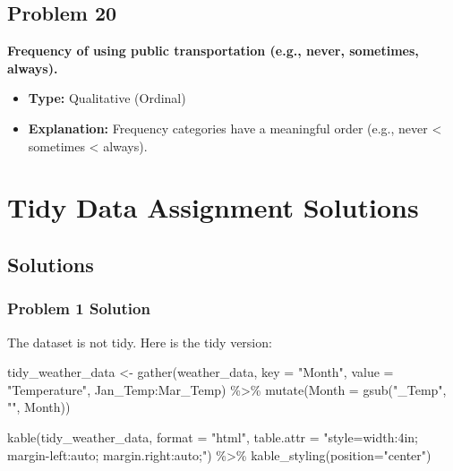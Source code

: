 \documentclass[
  letterpaper,
  DIV=11,
  numbers=noendperiod]{scrreprt}
\newenvironment{Shaded}{\begin{snugshade}}{\end{snugshade}}
\newcommand{\AttributeTok}[1]{\textcolor[rgb]{0.40,0.45,0.13}{#1}}
\newcommand{\FunctionTok}[1]{\textcolor[rgb]{0.28,0.35,0.67}{#1}}
\newcommand{\NormalTok}[1]{\textcolor[rgb]{0.00,0.23,0.31}{#1}}
\newcommand{\OtherTok}[1]{\textcolor[rgb]{0.00,0.23,0.31}{#1}}
\newcommand{\SpecialCharTok}[1]{\textcolor[rgb]{0.37,0.37,0.37}{#1}}
\newcommand{\StringTok}[1]{\textcolor[rgb]{0.13,0.47,0.30}{#1}}
\begin{document}
\section*{Problem 20}\label{problem-20-1}


\textbf{Frequency of using public transportation (e.g., never,
sometimes, always).}

\begin{itemize}
\item
  \textbf{Type:} Qualitative (Ordinal)
\item
  \textbf{Explanation:} Frequency categories have a meaningful order
  (e.g., never \textless{} sometimes \textless{} always).
\end{itemize}

\chapter*{Tidy Data Assignment
Solutions}\label{tidy-data-assignment-solutions}


\section*{Solutions}\label{solutions}


\subsection*{Problem 1 Solution}\label{problem-1-solution}

The dataset is not tidy. Here is the tidy version:

\begin{Shaded}
\begin{Highlighting}[]
\NormalTok{tidy\_weather\_data }\OtherTok{\textless{}{-}} \FunctionTok{gather}\NormalTok{(weather\_data, }\AttributeTok{key =} \StringTok{"Month"}\NormalTok{, }\AttributeTok{value =} \StringTok{"Temperature"}\NormalTok{, Jan\_Temp}\SpecialCharTok{:}\NormalTok{Mar\_Temp) }\SpecialCharTok{\%\textgreater{}\%}
  \FunctionTok{mutate}\NormalTok{(}\AttributeTok{Month =} \FunctionTok{gsub}\NormalTok{(}\StringTok{"\_Temp"}\NormalTok{, }\StringTok{""}\NormalTok{, Month))}

\FunctionTok{kable}\NormalTok{(tidy\_weather\_data, }\AttributeTok{format =} \StringTok{"html"}\NormalTok{, }\AttributeTok{table.attr =} \StringTok{"style=\textquotesingle{}width:4in; margin{-}left:auto; margin.right:auto;\textquotesingle{}"}\NormalTok{)  }\SpecialCharTok{\%\textgreater{}\%}
  \FunctionTok{kable\_styling}\NormalTok{(}\AttributeTok{position=}\StringTok{"center"}\NormalTok{)}
\end{Highlighting}
\end{Shaded}
\end{document}
